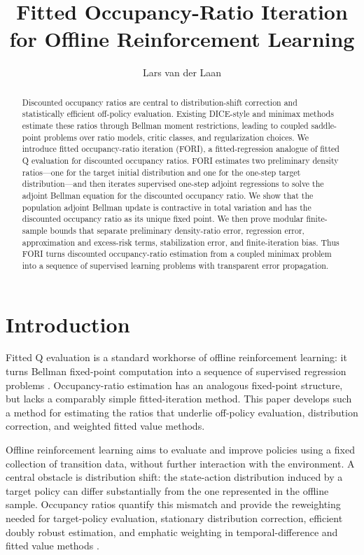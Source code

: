 \documentclass{article}
\title{Fitted Occupancy-Ratio Iteration for Offline Reinforcement Learning}
\author{Lars van der Laan}
\newcommand{\1}{\mathbf{1}}
\theoremstyle{plain}
\theoremstyle{definition}
\theoremstyle{remark}
\begin{document}
\maketitle
\begin{abstract}
Discounted occupancy ratios are central to distribution-shift correction and
statistically efficient off-policy evaluation. Existing DICE-style and minimax
methods estimate these ratios through Bellman moment restrictions, leading to
coupled saddle-point problems over ratio models, critic classes, and
regularization choices. We introduce fitted occupancy-ratio iteration
(\textsc{FORI}), a fitted-regression analogue of fitted Q evaluation for
discounted occupancy ratios. \textsc{FORI} estimates two preliminary density
ratios---one for the target initial distribution and one for the one-step
target distribution---and then iterates supervised one-step adjoint regressions to
solve the adjoint Bellman equation for the discounted occupancy ratio. We show
that the population adjoint Bellman update is contractive in total variation and
has the discounted occupancy ratio as its unique fixed point. We then prove
modular finite-sample bounds that separate preliminary density-ratio error, regression
error, approximation and excess-risk terms, stabilization error, and
finite-iteration bias. Thus \textsc{FORI} turns discounted occupancy-ratio
estimation from a coupled minimax problem into a sequence of supervised learning
problems with transparent error propagation.
\end{abstract}

\section{Introduction}

Fitted Q evaluation is a standard workhorse of offline reinforcement learning:
it turns Bellman fixed-point computation into a sequence of supervised
regression problems
\citep{lagoudakisParr2003LSPI,ernstEtAl2005TreeBatchRL,antosEtAl2007FQI,munosSzepesvari2008FVI,leEtAl2019BatchPolicyConstraints}.
Occupancy-ratio estimation has an analogous fixed-point structure, but lacks a
comparably simple fitted-iteration method. This paper develops such a method
for estimating the ratios that underlie off-policy evaluation, distribution
correction, and weighted fitted value methods.

Offline reinforcement learning aims to evaluate and improve policies using a
fixed collection of transition data, without further interaction with the
environment. A central obstacle is distribution shift: the state-action
distribution induced by a target policy can differ substantially from the one
represented in the offline sample. Occupancy ratios quantify this mismatch and
provide the reweighting needed for target-policy evaluation, stationary
distribution correction, efficient doubly robust estimation, and emphatic
weighting in temporal-difference and fitted value methods
\citep{thomasBrunskill2016DataEfficientOPE,jiangLi2016DoublyRobust,xieEtAl2019MarginalizedIS,yinWang2020EfficientTabularOPE,kallusUehara2020DoubleRL,liuEtAl2018InfiniteHorizonOPE,hallakMannor2017COPTD,suttonEtAl2016EmphaticTD,geladaBellemare2019CovariateShift}.
\end{document}
